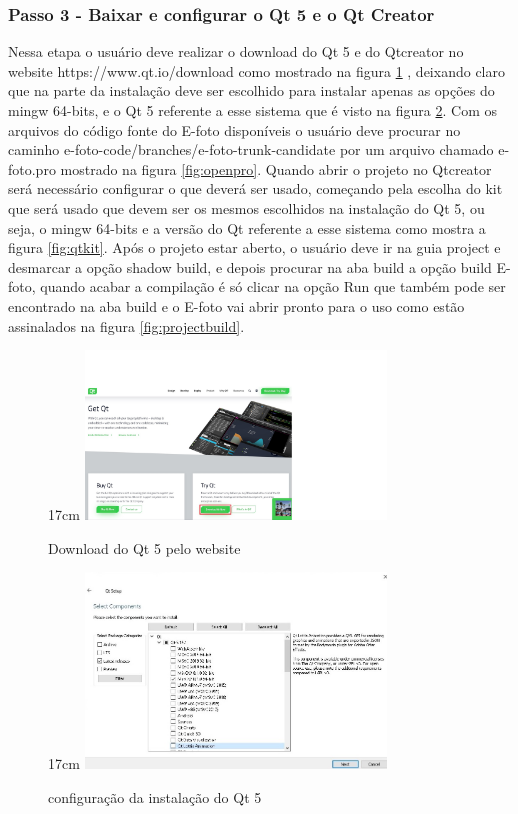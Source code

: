  \subsubsection{Passo 3 - Baixar e configurar o Qt 5 e o Qt Creator}
 Nessa etapa o usuário deve realizar o download do Qt 5 e do Qtcreator no website https://www.qt.io/download como mostrado na figura \ref{fig:downqt} , deixando claro que na parte da instalação deve ser escolhido para instalar apenas as opções do mingw 64-bits, e o Qt 5 referente a esse sistema que é visto na figura \ref{fig:qtinstallconfig}. Com os arquivos do código fonte do E-foto disponíveis o usuário deve procurar no caminho e-foto-code/branches/e-foto-trunk-candidate por um arquivo chamado e-foto.pro mostrado na figura \ref{fig:openpro}. Quando abrir o projeto no Qtcreator será necessário configurar o que deverá ser usado, começando pela escolha do kit que será usado que devem ser os mesmos escolhidos na instalação do Qt 5, ou seja, o mingw 64-bits e a versão do Qt referente a esse sistema como mostra a figura \ref{fig:qtkit}. Após o projeto estar aberto, o usuário deve ir na guia project e desmarcar a opção shadow build, e depois procurar na aba build a opção build E-foto, quando acabar a compilação é só clicar na opção Run que também pode ser encontrado na aba build e o E-foto vai abrir pronto para o uso como estão assinalados na figura \ref{fig:projectbuild}.
  \begin{figure}[!ht]{17cm}
  	\centering
 	\includegraphics[width=8cm]{Figuras/downqt.jpg}
 	\caption{Download do Qt 5 pelo website} \label{fig:downqt}
 \end{figure}

 \begin{figure}[!ht]{17cm}
 	\centering
	\includegraphics[width=8cm]{Figuras/qtinstallconfig.jpg}
	\caption{configuração da  instalação do Qt 5} \label{fig:qtinstallconfig}
\end{figure}

